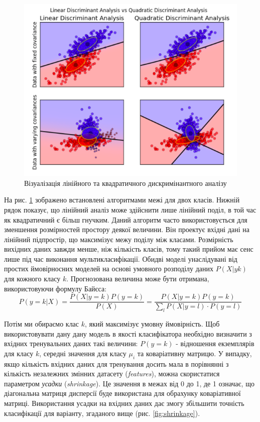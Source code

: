\begin{figure}[h!]
  \includegraphics[width=\linewidth]{figures/lda_qda.png}
  \caption{Візуалізація лінійного та квадратичного дискримінантного аналізу}
  \label{fig:lda_qda}
\end{figure}

На рис. \ref{fig:lda_qda} зображено встановлені алгоритмами межі для двох класів. Нижній рядок показує, що лінійний аналіз може здійснити лише лінійний поділ, в той час як квадратичний є більш гнучким. Даний алгоритм часто використовується для зменшення розмірностей простору деякої величини. Він проектує вхідні дані на лінійний підпростір, що максимізує межу поділу між класами. Розмірність вихідних даних завжди менше, ніж кількість класів, тому такий прийом має сенс лише під час виконання мультикласифікації. Обидві моделі унаслідувані від простих ймовірносних моделей на основі умовного розподілу даних $P(X|y  k)$ для кожного класу $k$. Прогнозована величина може бути отримана, використовуючи формулу Байєса:
\begin{equation}
    \label{eq:logistic_regression}
    P(y = k|X) = \frac{P(X|y = k)P(y=k)}{P(X)} = \frac{P(X|y = k)P(y = k)}{\sum_{l}P(X|y=l) \cdot P(y=l)}
\end{equation}

Потім ми обираємо клас $k$, який максимізує умовну ймовірність. Щоб використовувати дану дану модель в якості класифікатора необхідно визначити з вхідних тренувальних даних такі величини: $P(y=k)$ - відношення екземплярів для класу $k$, середні значення для класу $\mu_{i}$ та коваріативну матрицю. У випадку, якщо кількість вхідних даних для тренування досить мала в порівнянні з кількість незалежних змінних датасету (\textit{features}), можна скористатися параметром \textit{усадки} (\textit{shrinkage}). Це значення в межах від 0 до 1, де 1 означає, що діагональна матриця дисперсії буде використана для обрахунку коваріативної матриці. Використання усадки на вхідних даних дає змогу збільшити точність класифікації для варіанту, згаданого вище (рис. \ref{fig:shrinkage}).

